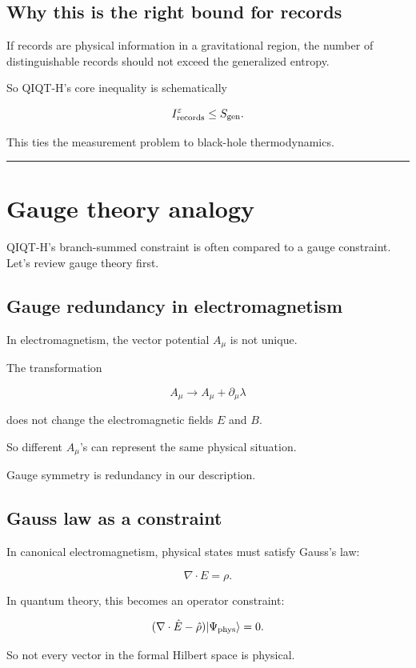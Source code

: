 \documentclass[11pt,a4paper]{article}
\begin{document}
\subsection{Why this is the right bound for records}

If records are physical information in a gravitational region, the number of distinguishable records should not exceed the generalized entropy.

So QIQT-H’s core inequality is schematically

\[
I_{\rm records}^{\varepsilon}
\leq
S_{\rm gen}.
\]

This ties the measurement problem to black-hole thermodynamics.

\medskip\hrule\medskip

\section{Gauge theory analogy}

QIQT-H’s branch-summed constraint is often compared to a gauge constraint. Let’s review gauge theory first.

\subsection{Gauge redundancy in electromagnetism}

In electromagnetism, the vector potential $A_\mu$ is not unique.

The transformation

\[
A_\mu \to A_\mu+\partial_\mu\lambda
\]

does not change the electromagnetic fields $E$ and $B$.

So different $A_\mu$'s can represent the same physical situation.

Gauge symmetry is redundancy in our description.

\subsection{Gauss law as a constraint}

In canonical electromagnetism, physical states must satisfy Gauss’s law:

\[
\nabla\cdot E=\rho.
\]

In quantum theory, this becomes an operator constraint:

\[
(\nabla\cdot \hat E-\hat\rho)|\Psi_{\rm phys}\rangle=0.
\]

So not every vector in the formal Hilbert space is physical.
\end{document}
